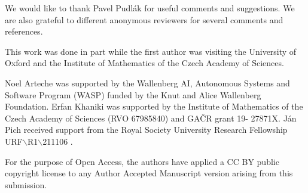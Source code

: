 \documentclass[11pt]{article}
\theoremstyle{definition}
\theoremstyle{plain}
\theoremstyle{remark}
\begin{document}
We would like to thank Pavel Pudlák for useful comments and suggestions. We are also grateful to different anonymous reviewers for several comments and references.

This work was done in part while the first author was visiting the University of Oxford and the Institute of Mathematics of the Czech Academy of Sciences.

Noel Arteche was supported by the Wallenberg AI, Autonomous Systems and Software Program (WASP) funded by the Knut and Alice Wallenberg Foundation. Erfan Khaniki was supported by the Institute of Mathematics of the Czech Academy of Sciences (RVO 67985840) and GAČR grant 19-
27871X. J\'an Pich received support from the Royal Society University Research Fellowship URF$\backslash$R1$\backslash$211106 .

For the purpose of Open Access, the authors have applied a CC BY public copyright license to any Author Accepted Manuscript version arising from this submission.




\end{document}
